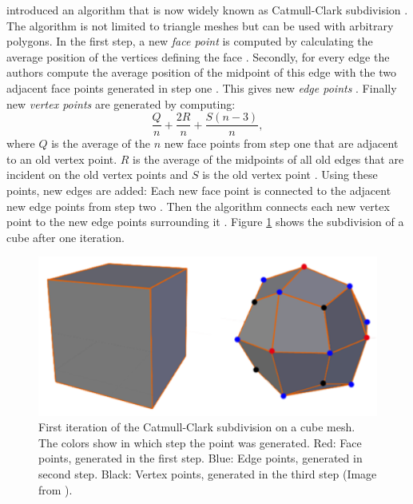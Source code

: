 \citeauthor{CATMULL1978350} introduced an algorithm that is now widely known as Catmull-Clark subdivision \cite{CATMULL1978350}.
The algorithm is not limited to triangle meshes but can be used with arbitrary polygons.
In the first step, a new \textit{face point} is computed by calculating the average position of the vertices defining the face \cite{CATMULL1978350}.
Secondly, for every edge the authors compute the average position of the midpoint of this edge with the two adjacent face points generated in step one \cite{CATMULL1978350}.
This gives new \textit{edge points} \cite{CATMULL1978350}.
Finally new \textit{vertex points} are generated by computing:
\begin{equation*}
	\frac{Q}{n} + \frac{2R}{n} + \frac{S(n-3)}{n},
\end{equation*}
where $Q$ is the average of the $n$ new face points from step one that are adjacent to an old vertex point.
$R$ is the average of the midpoints of all old edges that are incident on the old vertex points and $S$ is the old vertex point \cite{CATMULL1978350}.
Using these points, new edges are added: Each new face point is connected to the adjacent new edge points from step two \cite{CATMULL1978350}.
Then the algorithm connects each new vertex point to the new edge points surrounding it \cite{CATMULL1978350}.
Figure \ref{fig:catmull_clark_subdivision} shows the subdivision of a cube after one iteration.
\begin{figure}[ht]
    \centering
    \includegraphics[width=0.5\linewidth]{img/catmull_clark_subdivision.png}
    \caption[First iteration of the Catmull-Clark subdivision]{First iteration of the Catmull-Clark subdivision on a cube mesh. The colors show in which step the point was generated. Red: Face points, generated in the first step. Blue: Edge points, generated in second step. Black: Vertex points, generated in the third step (Image from \cite{cheng_catmull_clark_visualization}).}
    \label{fig:catmull_clark_subdivision}
\end{figure}

